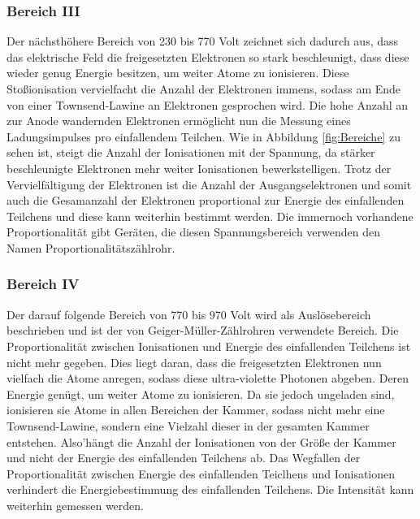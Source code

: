 \documentclass[titlepage = firstcover]{scrartcl}
\begin{document}
            \subsubsection*{Bereich III}
                Der nächsthöhere Bereich von 230 bis 770 Volt zeichnet sich dadurch aus, dass das elektrische Feld die freigesetzten Elektronen so stark beschleunigt, dass diese wieder genug Energie
                besitzen, um weiter Atome zu ionisieren. Diese Stoßionisation vervielfacht die Anzahl der Elektronen immens, sodass am Ende von einer Townsend-Lawine an Elektronen gesprochen wird. 
                Die hohe Anzahl an zur Anode wandernden Elektronen ermöglicht nun die Messung eines Ladungsimpulses pro einfallendem Teilchen. Wie in Abbildung \ref{fig:Bereiche} zu sehen ist, steigt die Anzahl der
                Ionisationen mit der Spannung, da stärker beschleunigte Elektronen mehr weiter Ionisationen bewerkstelligen. Trotz der Vervielfältigung der Elektronen ist die Anzahl der 
                Ausgangselektronen und somit auch die Gesamanzahl der Elektronen proportional zur Energie des einfallenden Teilchens und diese kann weiterhin bestimmt werden. Die immernoch vorhandene
                Proportionalität gibt Geräten, die diesen Spannungsbereich verwenden den Namen Proportionalitätszählrohr.
                
            \subsubsection*{Bereich IV}
                Der darauf folgende Bereich von 770 bis 970 Volt wird als Auslösebereich beschrieben und ist der von Geiger-Müller-Zählrohren verwendete Bereich. Die Proportionalität zwischen 
                Ionisationen und Energie des einfallenden Teilchens ist nicht mehr gegeben. Dies liegt daran, dass die freigesetzten Elektronen nun vielfach die Atome anregen, sodass diese 
                ultra-violette Photonen abgeben. Deren Energie genügt, um weiter Atome zu ionisieren. Da sie jedoch ungeladen sind, ionisieren sie Atome in allen Bereichen der Kammer, sodass nicht
                mehr eine Townsend-Lawine, sondern eine Vielzahl dieser in der gesamten Kammer entstehen. Also'hängt die Anzahl der Ionisationen von der Größe der Kammer und nicht der Energie des 
                einfallenden Teilchens ab. Das Wegfallen der Proportionalität zwischen Energie des einfallenden Teiclhens und Ionisationen verhindert die Energiebestimmung des einfallenden Teilchens.
                Die Intensität kann weiterhin gemessen werden.
\end{document}
